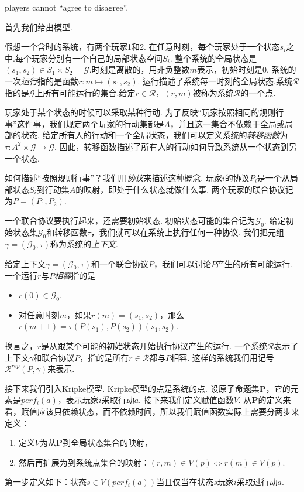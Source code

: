 \begin{center}
    players cannot ``agree to disagree''.
\end{center}

首先我们给出模型. 

假想一个含时的系统，有两个玩家1和2. 在任意时刻，每个玩家处于一个状态$s_i$之中.每个玩家分别有一个自己的局部状态空间$S_i$. 整个系统的全局状态是$(s_1,s_2)\in S_1\times S_2=\mathcal G$.时刻是离散的，用非负整数$m$表示，初始时刻是$0$. 系统的一次\emph{运行}指的是函数$r:m\mapsto(s_1,s_2)$. 运行描述了系统每一时刻的全局状态.系统$\mathcal R$指的是$\mathcal G$上所有可能运行的集合.给定$r\in\mathcal R$，$(r,m)$被称为系统$\mathcal R$的一个点.

玩家处于某个状态的时候可以采取某种行动. 为了反映“玩家按照相同的规则行事”这件事，我们规定两个玩家的行动集都是$A$，并且这一集合不依赖于全局或局部的状态. 给定所有人的行动和一个全局状态，我们可以定义系统的\emph{转移函数}为$\tau:A^2\times\mathcal G\to\mathcal G$. 因此，转移函数描述了所有人的行动如何导致系统从一个状态到另一个状态.

如何描述“按照规则行事”？我们用\emph{协议}来描述这种概念. 玩家$i$的协议$P_i$是一个从局部状态$S_i$到行动集$A$的映射，即处于什么状态就做什么事. 两个玩家的联合协议记为$P=(P_1,P_2)$.

一个联合协议要执行起来，还需要初始状态. 初始状态可能的集合记为$\mathcal G_0$. 给定初始状态集$\mathcal G_0$和转移函数$\tau$，我们就可以在系统上执行任何一种协议. 我们把元组$\gamma=(\mathcal G_0,\tau)$称为系统的\emph{上下文}. 

给定上下文$\gamma=(\mathcal G_0,\tau)$和一个联合协议$P$，我们可以讨论$P$产生的所有可能运行. 一个运行$r$与$P$\emph{相容}指的是
    \begin{itemize}
        \item $r(0)\in\mathcal G_0$.
        \item 对任意时刻$m$，如果$r(m)=(s_1,s_2)$，那么$r(m+1)=\tau(P(s_1),P(s_2))(s_1,s_2)$.
    \end{itemize}
换言之，$r$是从跟某个可能的初始状态开始执行协议产生的运行. 一个系统$\mathcal R$表示了上下文$\gamma$和联合协议$P$，指的是所有$r\in\mathcal R$都与$P$相容. 这样的系统我们用记号$\mathcal R^{rep}(P,\gamma)$来表示.


接下来我们引入Kripke模型. Kripke模型的点是系统的点. 设原子命题集$\mathbf P$，它的元素是$perf_i(a)$，表示玩家$i$采取行动$a$. 接下来我们定义赋值函数$V$. 从$\mathbf P$的定义来看，赋值应该只依赖状态，而不依赖时间，所以我们赋值函数实际上需要分两步来定义：
\begin{enumerate}
    \item 定义$V$为从$\mathbf P$到全局状态集合的映射，
    \item 然后再扩展为到系统点集合的映射：$(r,m)\in V(p)\iff r(m)\in V(p)$.
\end{enumerate}
第一步定义如下：状态$s\in V(perf_i(a))$当且仅当在状态$s$玩家$i$采取过行动$a$.

